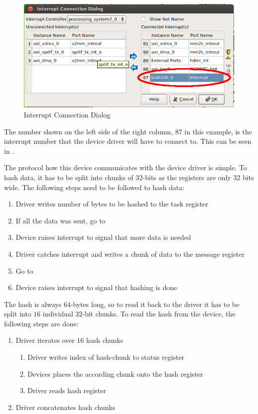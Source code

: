 \begin{figure}[h]
\centering
\includegraphics[width=1\textwidth]{sections/methodology/gicconnect}
\caption{\label{fig:gicconnect} Interrupt Connection Dialog}
\end{figure}

The number shown on the left side of the right column, $87$ in this example, is
the interrupt number that the device driver will have to connect to.
This can be seen in .

The protocol how this device communicates with the device driver is simple.
To hash data, it has to be split into chunks of $32$-bits as the registers are
only $32$ bits wide.
The following steps need to be followed to hash data:
\begin{enumerate}
	\item Driver writes number of bytes to be hashed to the task register
	\item If all the data was sent, go to \label{item:check}
	\item Device raises interrupt to signal that more data is needed
	\item Driver catches interrupt and writes a chunk of data to the message
		register
	\item Go to 
	\item Device raises interrupt to signal that hashing is done\label{item:end}
\end{enumerate}
The hash is always $64$-bytes long, so to read it back to the driver it has to
be split into $16$ individual $32$-bit chunks.
To read the hash from the device, the following steps are done:
\begin{enumerate}
	\item Driver iterates over $16$ hash chunks
		\begin{enumerate}
			\item Driver writes index of hash-chunk to status register
			\item Devices places the according chunk onto the hash register
			\item Driver reads hash register
		\end{enumerate}
	\item Driver concatenates hash chunks
\end{enumerate}
